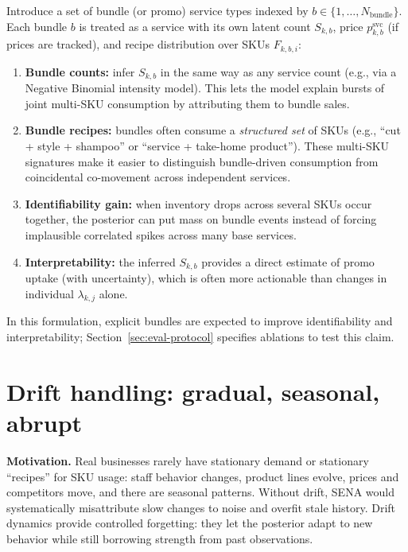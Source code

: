 \documentclass[11pt]{article}
\begin{document}
Introduce a set of bundle (or promo) service types indexed by $b\in\{1,\dots,N_{\mathrm{bundle}}\}$.
Each bundle $b$ is treated as a service with its own latent count $S_{k,b}$, price $p^{\mathrm{svc}}_{k,b}$ (if prices are tracked), and recipe distribution over SKUs $F_{k,b,i}$:
\begin{enumerate}
  \item \textbf{Bundle counts:} infer $S_{k,b}$ in the same way as any service count (e.g., via a Negative Binomial intensity model). This lets the model explain bursts of joint multi-SKU consumption by attributing them to bundle sales.

  \item \textbf{Bundle recipes:} bundles often consume a \emph{structured set} of SKUs (e.g., ``cut + style + shampoo'' or ``service + take-home product''). These multi-SKU signatures make it easier to distinguish bundle-driven consumption from coincidental co-movement across independent services.

  \item \textbf{Identifiability gain:} when inventory drops across several SKUs occur together, the posterior can put mass on bundle events instead of forcing implausible correlated spikes across many base services.

  \item \textbf{Interpretability:} the inferred $S_{k,b}$ provides a direct estimate of promo uptake (with uncertainty), which is often more actionable than changes in individual $\lambda_{k,j}$ alone.
\end{enumerate}

In this formulation, explicit bundles are expected to improve identifiability and interpretability; Section~\ref{sec:eval-protocol} specifies ablations to test this claim.

\section{Drift handling: gradual, seasonal, abrupt}\label{sec:drift-handling}

\textbf{Motivation.} Real businesses rarely have stationary demand or stationary ``recipes'' for SKU usage: staff behavior changes, product lines evolve, prices and competitors move, and there are seasonal patterns.
Without drift, SENA would systematically misattribute slow changes to noise and overfit stale history.
Drift dynamics provide controlled forgetting: they let the posterior adapt to new behavior while still borrowing strength from past observations.
\end{document}
